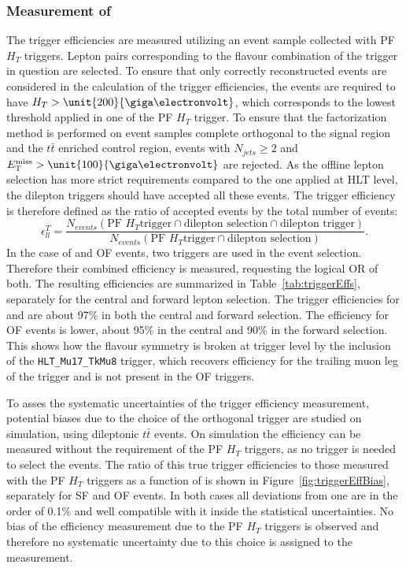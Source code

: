 \subsubsection{Measurement of \RT}
\label{sec:triggerEffs}
The trigger efficiencies are measured utilizing an event sample collected with PF $H_T$ triggers. Lepton pairs corresponding to the flavour combination of the trigger in question are selected. To ensure that only correctly reconstructed events are considered in the calculation of the trigger efficiencies, the events are required to have $H_T > \unit{200}{\giga\electronvolt}$, which corresponds to the lowest threshold applied in one of the PF $H_T$ trigger. To ensure that the factorization method is performed on event samples complete orthogonal to the signal region and the $t\bar{t}$ enriched control region, events with $N_{jets} \geq 2$ and $\MET > \unit{100}{\giga\electronvolt}$ are rejected. As the offline lepton selection has more strict requirements compared to the one applied at HLT level, the dilepton triggers should have accepted all these events. The trigger efficiency is therefore defined as the ratio of accepted events by the total number of events:
\begin{equation}
\epsilon_{ll}^T = \frac{N_{events}(\text{PF }H_T\text{trigger} \cap \text{dilepton selection} \cap \text{dilepton trigger})}{N_{events}(\text{PF }H_T\text{trigger} \cap \text{dilepton selection})}.
\end{equation}
In the case of \MM and OF events, two triggers are used in the event selection. Therefore their combined efficiency is measured, requesting the logical OR of both. The resulting efficiencies are summarized in Table~\ref{tab:triggerEffs}, separately for the central and forward lepton selection. The trigger efficiencies for \EE and \MM are about 97\% in both the central and forward selection. The efficiency for OF events is lower, about 95\% in the central and 90\% in the forward selection. This shows how the flavour symmetry is broken at trigger level by the inclusion of the \verb+HLT_Mu17_TkMu8+ trigger, which recovers efficiency for the trailing muon leg of the trigger and is not present in the OF triggers.   

To asses the systematic uncertainties of the trigger efficiency measurement, potential biases due to the choice of the orthogonal trigger  are studied on simulation, using dileptonic $t\bar{t}$ events. On simulation the efficiency can be measured without the requirement of the PF $H_T$ triggers, as no trigger is needed to select the events. The ratio of this true trigger efficiencies to those measured with the PF $H_T$ triggers as a function of \mll is shown in Figure~\ref{fig:triggerEffBias}, separately for SF and OF events. In both cases all deviations from one are in the order of 0.1\% and well compatible with it inside the statistical uncertainties. No bias of the efficiency measurement due to the PF $H_T$ triggers is observed and therefore no systematic uncertainty due to this choice is assigned to the measurement.
